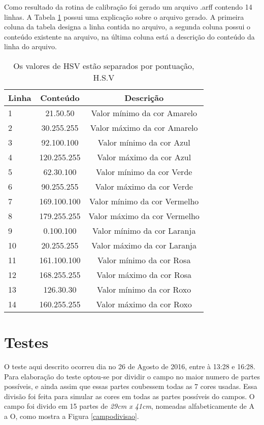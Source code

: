 Como resultado da rotina de calibração foi gerado um arquivo .arff contendo 14 linhas. A Tabela \ref{tab:arquivo} possui uma explicação sobre o arquivo gerado. A primeira coluna da tabela designa a linha contida no arquivo, a segunda coluna possui o conteúdo existente na arquivo, na última coluna está a descrição do conteúdo da linha do arquivo.
	\begin{table}[H]
\centering 
\begin{tabular}{l|c|c}
Linha & Conteúdo & Descrição  \\%
\hline                               %
 1& 21.50.50  &   Valor mínimo da cor Amarelo \\ \hline  
2& 30.255.255  &  Valor máximo da cor Amarelo \\  \hline 
3& 92.100.100  &   Valor mínimo da cor Azul \\  \hline 
4& 120.255.255  &  Valor máximo da cor  Azul \\  \hline 
5& 62.30.100 &  Valor mínimo da cor Verde \\  \hline 
6& 90.255.255  &  Valor máximo da cor Verde \\  \hline 
7& 169.100.100  &  Valor mínimo da cor Vermelho \\  \hline 
8& 179.255.255  &  Valor máximo da cor Vermelho \\   \hline 
9& 0.100.100  &  Valor mínimo da cor Laranja \\  \hline 
10& 20.255.255 &  Valor máximo da cor  Laranja \\  \hline 
11& 161.100.100 &  Valor mínimo da cor Rosa \\  \hline 
12& 168.255.255 &   Valor máximo da cor Rosa \\  \hline 
13& 126.30.30 &  Valor mínimo da cor Roxo \\  \hline 
14& 160.255.255 &  Valor máximo da cor Roxo \\  \hline 

\end{tabular}
\caption{Os valores de HSV estão separados por pontuação, H.S.V}
\label{tab:arquivo}
\end{table}





 \section{Testes}
O teste aqui descrito ocorreu dia no 26 de Agosto de 2016, entre à 13:28 e 16:28.
Para elaboração do teste optou-se por dividir o campo no maior numero de partes possíveis, e ainda assim que essas partes coubessem todas as 7 cores usadas. Essa divisão foi feita para simular as cores em todas as partes possíveis do campos. O campo foi divido em 15 partes de \textit{29cm x 41cm}, nomeadas alfabeticamente de A a O, como mostra a Figura \ref{campodivisao}.

